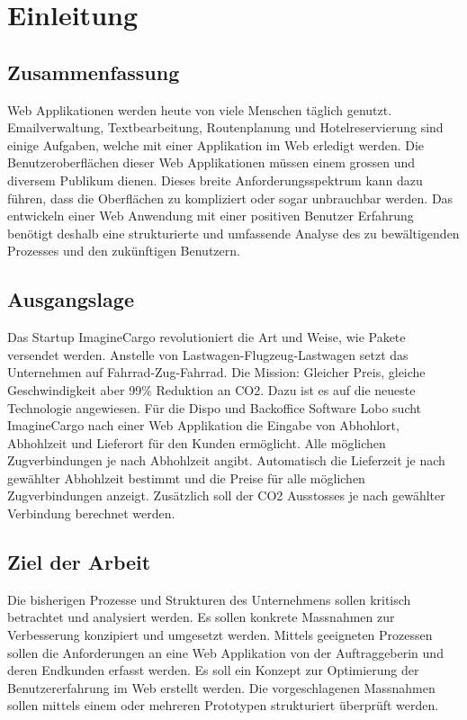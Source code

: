 \chapter{Einleitung}
\label{sec:Einleitung}

\section{Zusammenfassung}
\label{sec:zusammenfassung}
Web Applikationen werden heute von viele Menschen täglich genutzt. Emailverwaltung, Textbearbeitung, Routenplanung und Hotelreservierung sind einige Aufgaben, welche mit einer Applikation im Web erledigt werden. Die Benutzeroberflächen dieser Web Applikationen müssen einem grossen und diversem Publikum dienen. Dieses breite Anforderungsspektrum kann dazu führen, dass die Oberflächen zu kompliziert oder sogar unbrauchbar werden. Das entwickeln einer Web Anwendung mit einer positiven Benutzer Erfahrung benötigt deshalb eine strukturierte und umfassende Analyse des zu bewältigenden Prozesses und den zukünftigen Benutzern.

\section{Ausgangslage}
\label{sec:ausgangslage}
Das Startup ImagineCargo revolutioniert die Art und Weise, wie Pakete versendet werden. Anstelle von Lastwagen-Flugzeug-Lastwagen setzt das Unternehmen auf Fahrrad-Zug-Fahrrad. Die Mission: Gleicher  Preis, gleiche Geschwindigkeit aber 99\% Reduktion an CO2. Dazu ist es auf die neueste Technologie angewiesen. Für die Dispo und Backoffice Software Lobo sucht ImagineCargo nach einer Web Applikation die Eingabe von Abhohlort, Abhohlzeit und Lieferort für den Kunden ermöglicht. Alle möglichen Zugverbindungen je nach Abhohlzeit angibt. Automatisch die Lieferzeit je nach gewählter Abhohlzeit bestimmt und die Preise für alle möglichen Zugverbindungen anzeigt. Zusätzlich soll der CO2 Ausstosses je nach gewählter Verbindung berechnet werden.


\section{Ziel der Arbeit}
\label{sec:zielderarbeit}
Die bisherigen Prozesse und Strukturen des Unternehmens sollen kritisch betrachtet und analysiert werden. Es sollen konkrete Massnahmen zur Verbesserung konzipiert und umgesetzt werden. Mittels geeigneten Prozessen sollen die Anforderungen an eine Web Applikation von der Auftraggeberin und deren Endkunden erfasst werden. Es soll ein Konzept zur Optimierung der Benutzererfahrung im Web erstellt werden. Die vorgeschlagenen Massnahmen sollen mittels einem oder mehreren Prototypen strukturiert überprüft werden.

